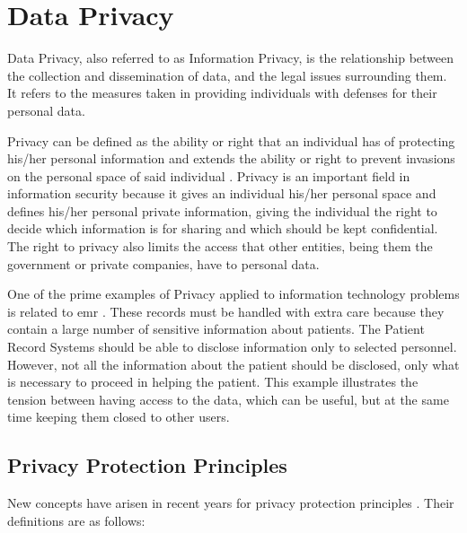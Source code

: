 \section{Data Privacy} 
\label{sec:DataPrivacy}


Data Privacy, also referred to as Information Privacy, is the relationship between the collection and dissemination of data, and the legal issues surrounding them. It refers to the measures taken in providing individuals with defenses for their personal data.

Privacy can be defined as the ability or right that an individual has of protecting his/her personal information and extends the ability or right to prevent invasions on the personal space of said individual \cite{anderson2008security}.
Privacy is an important field in information security because it gives an individual his/her personal space and defines his/her personal private information, giving the individual the right to decide which information is for sharing and which should be kept confidential. The right to privacy also limits the access that other entities, being them the government or private companies, have to personal data.


One of the prime examples of Privacy applied to information technology problems is related to \ac{emr} \cite{Lu2014}. These records must be handled with extra care because they contain a large number of sensitive information about patients. The Patient Record Systems should be able to disclose information only to selected personnel. However, not all the information about the patient should be disclosed, only what is necessary to proceed in helping the patient. This example illustrates the tension between having access to the data, which can be useful, but at the same time keeping them closed to other users.



\subsection{Privacy Protection Principles}
\label{ssec:PrivacyProtectionGoals}

New concepts have arisen in recent years for privacy protection principles \cite{Danezis2015}. Their definitions are as follows:

